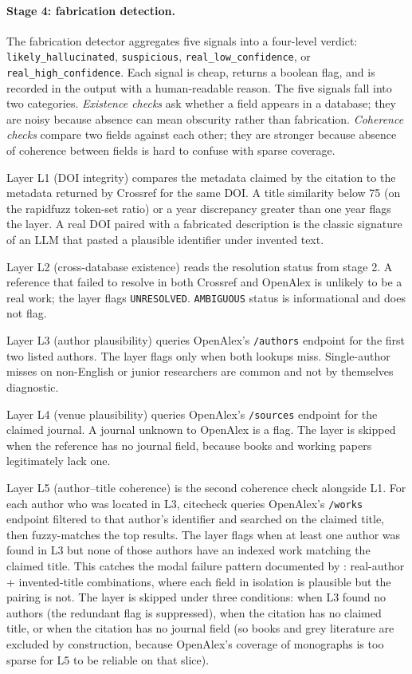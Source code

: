 \documentclass[12pt]{article}
\begin{document}
\paragraph{Stage 4: fabrication detection.} The fabrication detector aggregates five signals into a four-level verdict: \texttt{likely\_hallucinated}, \texttt{suspicious}, \texttt{real\_low\_confidence}, or \texttt{real\_high\_confidence}. Each signal is cheap, returns a boolean flag, and is recorded in the output with a human-readable reason. The five signals fall into two categories. \emph{Existence checks} ask whether a field appears in a database; they are noisy because absence can mean obscurity rather than fabrication. \emph{Coherence checks} compare two fields against each other; they are stronger because absence of coherence between fields is hard to confuse with sparse coverage.

Layer L1 (DOI integrity) compares the metadata claimed by the citation to the metadata returned by Crossref for the same DOI. A title similarity below 75 (on the rapidfuzz token-set ratio) or a year discrepancy greater than one year flags the layer. A real DOI paired with a fabricated description is the classic signature of an LLM that pasted a plausible identifier under invented text.

Layer L2 (cross-database existence) reads the resolution status from stage 2. A reference that failed to resolve in both Crossref and OpenAlex is unlikely to be a real work; the layer flags \texttt{UNRESOLVED}. \texttt{AMBIGUOUS} status is informational and does not flag.

Layer L3 (author plausibility) queries OpenAlex's \texttt{/authors} endpoint for the first two listed authors. The layer flags only when both lookups miss. Single-author misses on non-English or junior researchers are common and not by themselves diagnostic.

Layer L4 (venue plausibility) queries OpenAlex's \texttt{/sources} endpoint for the claimed journal. A journal unknown to OpenAlex is a flag. The layer is skipped when the reference has no journal field, because books and working papers legitimately lack one.

Layer L5 (author--title coherence) is the second coherence check alongside L1. For each author who was located in L3, citecheck queries OpenAlex's \texttt{/works} endpoint filtered to that author's identifier and searched on the claimed title, then fuzzy-matches the top results. The layer flags when at least one author was found in L3 but none of those authors have an indexed work matching the claimed title. This catches the modal failure pattern documented by \citet{walters_wilder_2023}: real-author + invented-title combinations, where each field in isolation is plausible but the pairing is not. The layer is skipped under three conditions: when L3 found no authors (the redundant flag is suppressed), when the citation has no claimed title, or when the citation has no journal field (so books and grey literature are excluded by construction, because OpenAlex's coverage of monographs is too sparse for L5 to be reliable on that slice).
\end{document}
